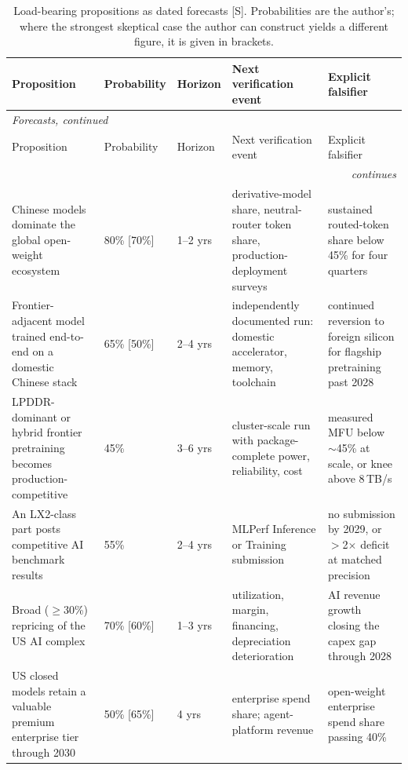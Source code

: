 \begin{small}
\begin{longtable}{p{42mm}p{16mm}p{13mm}p{31mm}p{31mm}}
  \caption{Load-bearing propositions as dated forecasts [S]. Probabilities are the author's; where the strongest skeptical case the author can construct yields a different figure, it is given in brackets.}
  \label{tab:forecasts} \\
  \toprule
  Proposition & Probability & Horizon & Next verification event & Explicit falsifier \\
  \midrule
  \endfirsthead
  \multicolumn{5}{l}{\footnotesize\emph{Forecasts, continued}} \\
  \toprule
  Proposition & Probability & Horizon & Next verification event & Explicit falsifier \\
  \midrule
  \endhead
  \midrule
  \multicolumn{5}{r}{\footnotesize\emph{continues}} \\
  \endfoot
  \bottomrule
  \endlastfoot
    Chinese models dominate the global open-weight ecosystem & 80\% [70\%] & 1--2 yrs & derivative-model share, neutral-router token share, production-deployment surveys & sustained routed-token share below 45\% for four quarters \\
    \addlinespace
    Frontier-adjacent model trained end-to-end on a domestic Chinese stack & 65\% [50\%] & 2--4 yrs & independently documented run: domestic accelerator, memory, toolchain & continued reversion to foreign silicon for flagship pretraining past 2028 \\
    \addlinespace
    LPDDR-dominant or hybrid frontier pretraining becomes production-competitive & 45\% & 3--6 yrs & cluster-scale run with package-complete power, reliability, cost & measured MFU below $\sim$45\% at scale, or knee above 8\,TB/s \\
    \addlinespace
    An LX2-class part posts competitive AI benchmark results & 55\% & 2--4 yrs & MLPerf Inference or Training submission & no submission by 2029, or $>$2$\times$ deficit at matched precision \\
    \addlinespace
    Broad ($\geq$30\%) repricing of the US AI complex & 70\% [60\%] & 1--3 yrs & utilization, margin, financing, depreciation deterioration & AI revenue growth closing the capex gap through 2028 \\
    \addlinespace
    US closed models retain a valuable premium enterprise tier through 2030 & 50\% [65\%] & 4 yrs & enterprise spend share; agent-platform revenue & open-weight enterprise spend share passing 40\% \\

\end{longtable}
\end{small}
